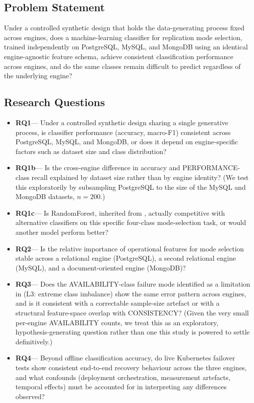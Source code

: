\documentclass[iicol,pdflatex,sn-mathphys-num]{sn-jnl}
\theoremstyle{thmstyleone}
\theoremstyle{thmstylethree}
\begin{document}
\subsection{Problem Statement}\label{subsec:problem}

Under a controlled synthetic design that holds the data-generating
process fixed across engines, does a machine-learning classifier for
replication mode selection, trained independently on PostgreSQL,
MySQL, and MongoDB using an identical engine-agnostic feature schema,
achieve consistent classification performance across engines, and do
the same classes remain difficult to predict regardless of the
underlying engine?

\subsection{Research Questions}\label{subsec:rqs}

\newcommand{\rqlabel}[1]{\textbf{#1}\hspace{0.6em}---\hspace{0.4em}}

\begin{itemize}
\item[] \rqlabel{RQ1} Under a controlled synthetic design sharing a
  single generative process, is classifier performance (accuracy,
  macro-F1) consistent across PostgreSQL, MySQL, and MongoDB, or does
  it depend on engine-specific factors such as dataset size and class
  distribution?
\item[] \rqlabel{RQ1b} Is the cross-engine difference in accuracy and
  PERFORMANCE-class recall explained by dataset size rather than by
  engine identity? (We test this exploratorily by subsampling
  PostgreSQL to the size of the MySQL and MongoDB datasets, $n=200$.)
\item[] \rqlabel{RQ1c} Is RandomForest, inherited from \cite{iaha2026},
  actually competitive with alternative classifiers on this specific
  four-class mode-selection task, or would another model perform
  better?
\item[] \rqlabel{RQ2} Is the relative importance of operational features
  for mode selection stable across a relational engine (PostgreSQL),
  a second relational engine (MySQL), and a document-oriented engine
  (MongoDB)?
\item[] \rqlabel{RQ3} Does the AVAILABILITY-class failure mode identified
  as a limitation in \cite{iaha2026} (L3: extreme class imbalance)
  show the same error pattern across engines, and is it consistent
  with a correctable sample-size artefact or with a structural
  feature-space overlap with CONSISTENCY? (Given the very small
  per-engine AVAILABILITY counts, we treat this as an exploratory,
  hypothesis-generating question rather than one this study is
  powered to settle definitively.)
\item[] \rqlabel{RQ4} Beyond offline classification accuracy, do live
  Kubernetes failover tests show consistent end-to-end recovery
  behaviour across the three engines, and what confounds (deployment
  orchestration, measurement artefacts, temporal effects) must be
  accounted for in interpreting any differences observed?
\end{itemize}
\end{document}
